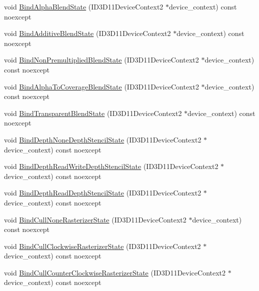 \begin{DoxyCompactItemize}
\item 
void \hyperlink{structmage_1_1_rendering_state_cache_a576da855238a9bfb03ecbb266e870d05}{Bind\+Alpha\+Blend\+State} (I\+D3\+D11\+Device\+Context2 $\ast$device\+\_\+context) const noexcept
\item 
void \hyperlink{structmage_1_1_rendering_state_cache_aa5ebc4c062269a9e1d4dbd5c50b09fb9}{Bind\+Additive\+Blend\+State} (I\+D3\+D11\+Device\+Context2 $\ast$device\+\_\+context) const noexcept
\item 
void \hyperlink{structmage_1_1_rendering_state_cache_a736da8f67a4525558399d979ff95e55a}{Bind\+Non\+Premultiplied\+Blend\+State} (I\+D3\+D11\+Device\+Context2 $\ast$device\+\_\+context) const noexcept
\item 
void \hyperlink{structmage_1_1_rendering_state_cache_af878b3d078b3ee61ca3a5ca713e65672}{Bind\+Alpha\+To\+Coverage\+Blend\+State} (I\+D3\+D11\+Device\+Context2 $\ast$device\+\_\+context) const noexcept
\item 
void \hyperlink{structmage_1_1_rendering_state_cache_ab85b22d9a4c22dd02e687a97f4e7b8e7}{Bind\+Transparent\+Blend\+State} (I\+D3\+D11\+Device\+Context2 $\ast$device\+\_\+context) const noexcept
\item 
void \hyperlink{structmage_1_1_rendering_state_cache_ab48c76cd1e0854d9a781215f1838a0c9}{Bind\+Depth\+None\+Depth\+Stencil\+State} (I\+D3\+D11\+Device\+Context2 $\ast$device\+\_\+context) const noexcept
\item 
void \hyperlink{structmage_1_1_rendering_state_cache_a8f8f13644b1f636ba4150b60a6a3a3f3}{Bind\+Depth\+Read\+Write\+Depth\+Stencil\+State} (I\+D3\+D11\+Device\+Context2 $\ast$device\+\_\+context) const noexcept
\item 
void \hyperlink{structmage_1_1_rendering_state_cache_a60252b4a84c012de132a53a67e3f97c3}{Bind\+Depth\+Read\+Depth\+Stencil\+State} (I\+D3\+D11\+Device\+Context2 $\ast$device\+\_\+context) const noexcept
\item 
void \hyperlink{structmage_1_1_rendering_state_cache_ac1ac583238fe5339bbba5792fd03b8aa}{Bind\+Cull\+None\+Rasterizer\+State} (I\+D3\+D11\+Device\+Context2 $\ast$device\+\_\+context) const noexcept
\item 
void \hyperlink{structmage_1_1_rendering_state_cache_a77e3977ff0a4f672d1b15f91a80da1f4}{Bind\+Cull\+Clockwise\+Rasterizer\+State} (I\+D3\+D11\+Device\+Context2 $\ast$device\+\_\+context) const noexcept
\item 
void \hyperlink{structmage_1_1_rendering_state_cache_aa9330c398a1490ae79079e0b75d62be9}{Bind\+Cull\+Counter\+Clockwise\+Rasterizer\+State} (I\+D3\+D11\+Device\+Context2 $\ast$device\+\_\+context) const noexcept

\end{DoxyCompactItemize}
